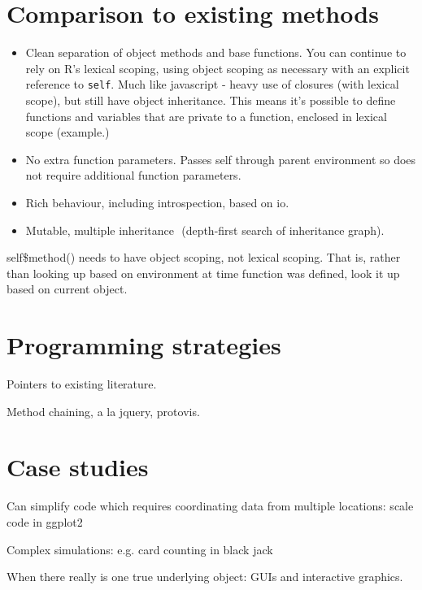 \documentclass[oneside]{article}
\begin{document}
\section{Comparison to existing methods}
\label{sec:existing}

\begin{itemize}
  \item Clean separation of object methods and base functions.  You can continue to rely on R's lexical scoping, using object scoping as necessary with an explicit reference to {\tt self}.  Much like javascript - heavy use of closures (with lexical scope), but still have object inheritance.  This means it's possible to define functions and variables that are private to a function, enclosed in lexical scope (example.)

  \item No extra function parameters.  Passes self through parent environment so does not require additional function parameters. 

  \item Rich behaviour, including introspection, based on io.

  \item Mutable, multiple inheritance  (depth-first search of inheritance graph).
\end{itemize}

self\$method() needs to have object scoping, not lexical scoping.
That is, rather than looking up based on environment at time function was defined, look it up based on current object.

\section{Programming strategies}
\label{sec:strategies}

Pointers to existing literature.

Method chaining, a la jquery, protovis.

\section{Case studies}
\label{sec:case_studies}

Can simplify code which requires coordinating data from multiple locations: scale code in ggplot2

Complex simulations: e.g. card counting in black jack

When there really is one true underlying object: GUIs and interactive graphics.
\end{document}
